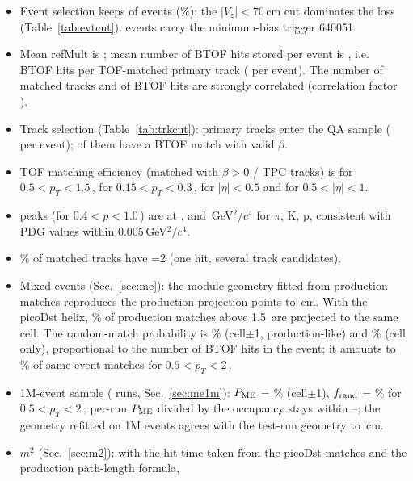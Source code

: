 \begin{itemize}
\item Event selection keeps \nEvtSel{} of \nEvtAll{} events (\fracSel\%); the $|V_z|<70$\,cm cut
  dominates the loss (Table~\ref{tab:evtcut}). \nEvtTrig{} events carry the minimum-bias trigger 640051.
\item Mean refMult is \meanRefMult; mean number of BTOF hits stored per event is \meanNBTofHits,
  i.e.\ \hitsPerMatched{} BTOF hits per TOF-matched primary track (\perEvtTrkBeta{} per event).
  The number of matched tracks and of BTOF hits are strongly correlated (correlation factor \corrTofTrkHits).
\item Track selection (Table~\ref{tab:trkcut}): \nTrkEta{} primary tracks enter the QA sample
  (\perEvtTrkEta{} per event); \nTrkBeta{} of them have a BTOF match with valid $\beta$.
\item TOF matching efficiency (matched with $\beta>0$ / TPC tracks) is \effMid{} for $0.5<p_T<1.5$\,\GeVc,
  \effLow{} for $0.15<p_T<0.3$\,\GeVc, \effEtaCentral{} for $|\eta|<0.5$ and \effEtaOuter{} for $0.5<|\eta|<1$.
\item \mtwo{} peaks (for $0.4<p<1.0$\,\GeVc) are at \mTwoMeanPi, \mTwoMeanK{} and \mTwoMeanP{}\,GeV$^2/c^4$
  for $\pi$, K, p, consistent with PDG values within 0.005\,GeV$^2/c^4$.
\item \fracFlagTwo\% of matched tracks have =2 (one hit, several track candidates).
\item Mixed events (Sec.~\ref{sec:me}): the module geometry fitted from production matches reproduces the
  production projection points to \geoFitRmsTest\,cm. With the picoDst helix, \meFracPMCellHiTest\% of production matches above
  1.5\,\GeVc{} are projected to the same cell. The random-match probability is \mePMENbpctTest\% (cell$\pm$1, production-like)
  and \mePMEpctTest\% (cell only), proportional to the number of BTOF hits in the event; it amounts to
  \meFakeMidNbTest\% of same-event matches for $0.5<p_T<2$\,\GeVc.
\item 1M-event sample (\meNRunsVthree{} runs, Sec.~\ref{sec:me1m}): $P_{\rm ME}$ = \mePMENbpctVthree\% (cell$\pm$1),
  $f_{\rm rand}$ = \meFakeMidNbVthree\% for $0.5<p_T<2$\,\GeVc; per-run $P_{\rm ME}$ divided by the occupancy stays within
  \mePMEoccMinVthree--\mePMEoccMaxVthree; the geometry refitted on 1M events agrees with the test-run geometry to \geoCmpMeanVthree\,cm.
\item $m^2$ (Sec.~\ref{sec:m2}): with the hit time taken from the picoDst matches and the production path-length formula,

\end{itemize}
